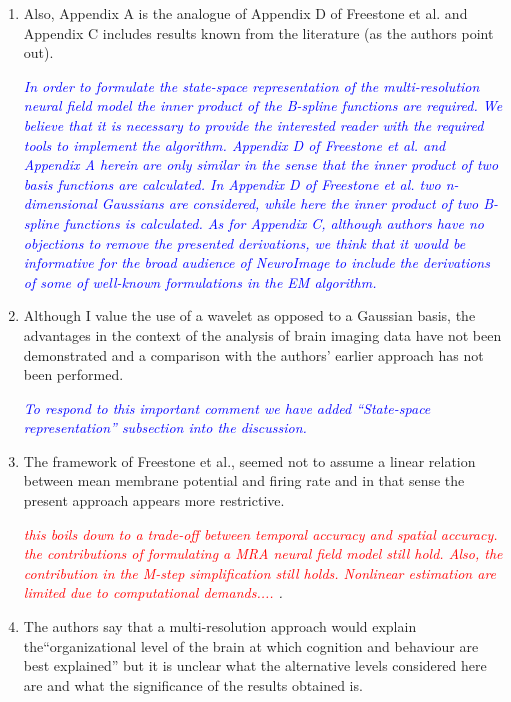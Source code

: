 \documentclass{article}
\newcommand{\dean}[1]{\textcolor{red}{#1}}
\newcommand{\parham}[1]{\textcolor{blue}{#1}}
\begin{document}
\begin{enumerate}
        \item Also, Appendix A is the analogue of Appendix D of Freestone et al. and Appendix C includes results known from the literature (as the authors point out).

\emph{\parham{In order to formulate the state-space representation of the multi-resolution neural field model the inner product of the B-spline functions are required. We believe that it is necessary to provide the interested reader with the required tools to implement the algorithm. Appendix D of Freestone et al. and Appendix A herein are only similar in the sense that the inner product of two basis functions are calculated. In Appendix D of Freestone et al. two  n-dimensional Gaussians are considered, while here the inner product of two B-spline functions is calculated. As for Appendix C, although authors have no objections to remove the presented derivations, we think that it would be informative for the broad audience of NeuroImage to include the derivations of some of well-known formulations in the EM algorithm.} }

        \item Although I value the use of a wavelet as opposed to a Gaussian basis, the advantages in the context of the analysis of brain imaging data have not been demonstrated and a comparison with the authors' earlier approach has not been performed.  

\emph{\parham{To respond to this important comment we have added ``State-space representation'' subsection into the discussion.}}

				\item{The framework of Freestone et al., seemed not to assume a linear relation between mean membrane potential and firing rate and in that sense the present approach appears more restrictive. }
				
\emph{\dean{this boils down to a trade-off between temporal accuracy and spatial accuracy. the contributions of formulating a MRA neural field model still hold. Also, the contribution in the M-step simplification still holds. Nonlinear estimation are limited due to computational demands.... }.}
				

        \item The authors say that a multi-resolution approach would explain the``organizational level of the brain at which cognition and behaviour are best explained'' but it is unclear what the alternative levels considered here are and what the significance of the results obtained is.


\end{enumerate}
\end{document}
